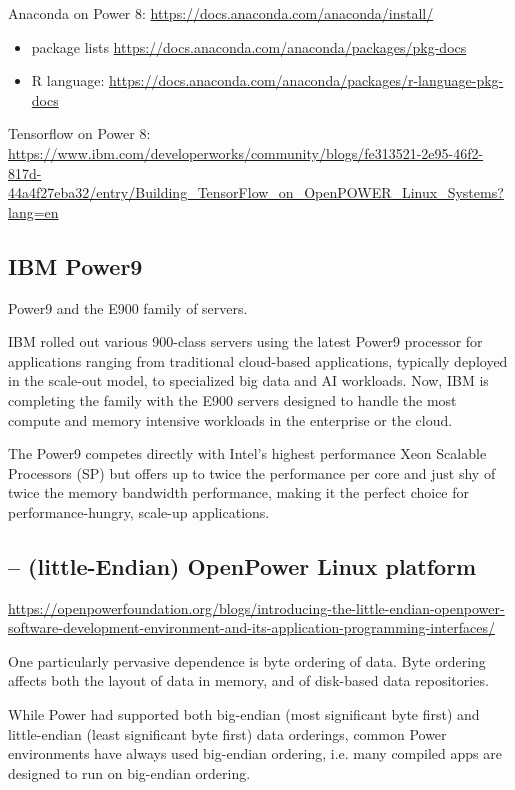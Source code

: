 Anaconda on Power 8: \url{https://docs.anaconda.com/anaconda/install/}
\begin{itemize}
  \item package lists \url{https://docs.anaconda.com/anaconda/packages/pkg-docs}
  
  \item R language:
  \url{https://docs.anaconda.com/anaconda/packages/r-language-pkg-docs}
  
\end{itemize}


Tensorflow on Power 8:
\url{https://www.ibm.com/developerworks/community/blogs/fe313521-2e95-46f2-817d-44a4f27eba32/entry/Building_TensorFlow_on_OpenPOWER_Linux_Systems?lang=en}

\subsection{IBM Power9}
\label{sec:Power9-IBM}

Power9 and the E900 family of servers.

IBM rolled out various 900-class servers using the latest Power9 processor for
applications ranging from traditional cloud-based applications, typically
deployed in the scale-out model, to specialized big data and AI workloads.
Now, IBM is completing the family with the E900 servers designed to handle the
most compute and memory intensive workloads in the enterprise or the cloud.

The Power9 competes directly with Intel’s highest performance Xeon Scalable
Processors (SP) but offers up to twice the performance per core and just shy of
twice the memory bandwidth performance, making it the perfect choice for
performance-hungry, scale-up applications.



\subsection{-- (little-Endian) OpenPower Linux platform}

\url{https://openpowerfoundation.org/blogs/introducing-the-little-endian-openpower-software-development-environment-and-its-application-programming-interfaces/}


One particularly pervasive dependence is  byte ordering of data.  Byte ordering
affects both the layout of data in memory, and of disk-based data repositories.

While Power had supported both big-endian (most significant byte first) and
little-endian (least significant byte first) data orderings, common Power
environments have always used big-endian ordering, i.e. many compiled apps are
designed to run on big-endian ordering.
 
